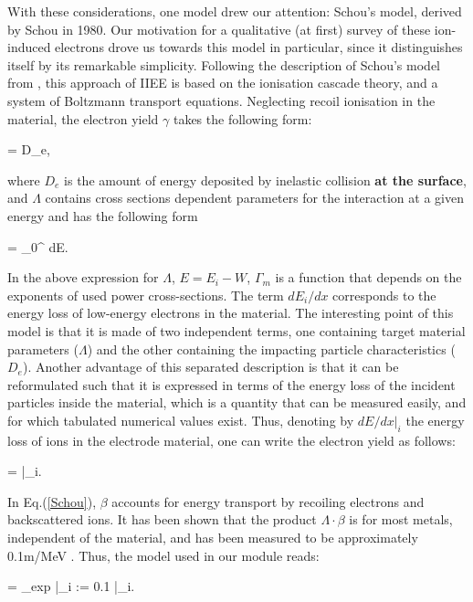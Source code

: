 \noindent With these considerations, one model drew our attention: Schou's model, derived by Schou in 1980. Our motivation for a qualitative (at first) survey of these ion-induced electrons drove us towards this model in particular, since it distinguishes itself by its remarkable simplicity. Following the description of Schou's model from \cite{HasselII}, this approach of IIEE is based on the ionisation cascade theory, and a system of Boltzmann transport equations.  Neglecting recoil ionisation in the material, the electron yield $\gamma$ takes the following form: 

\beq
\gamma = \Lambda \cdot D_e,
\eeq

\noindent where $D_e$ is the amount of energy deposited by inelastic collision \textbf{at the surface}, and $\Lambda$ contains cross sections dependent parameters for the interaction at a given energy and has the following form 

\beq
\Lambda = \int_0^{\infty} dE.
\eeq

\noindent In the above expression for $\Lambda$, $E=E_i-W$, $\Gamma_m$ is a function that depends on the exponents of used power cross-sections. The term $dE_i/dx$ corresponds to the energy loss of low-energy electrons in the material. The interesting point of this model is that it is made of two independent terms, one containing target material parameters ($\Lambda$) and the other containing the impacting particle characteristics ($D_e$). Another advantage of this separated description is that it can be reformulated such that it is expressed in terms of the energy loss of the incident particles inside the material, which is a quantity that can be measured easily, and for which tabulated numerical values exist. Thus, denoting by $dE/dx\Big|_i$ the energy loss of ions in the electrode material, one can write the electron yield as follows: 

\beq
\gamma = \Lambda \cdot \beta \cdot  {}\Bigg|_i.\label{Schou}
\eeq

\noindent In Eq.(\ref{Schou}), $\beta$ accounts for energy transport by recoiling electrons and backscattered ions. It has been shown that the product $\Lambda\cdot\beta$ is for most metals, independent of the material, and has been measured to be approximately 0.1m/MeV \cite{HasselII}. Thus, the model used in our module reads:

\beq
\gamma = \Lambda_{exp} \cdot  {}\Bigg|_i := 0.1 \cdot  {}\Bigg|_i.\label{Schou_def}
\eeq

